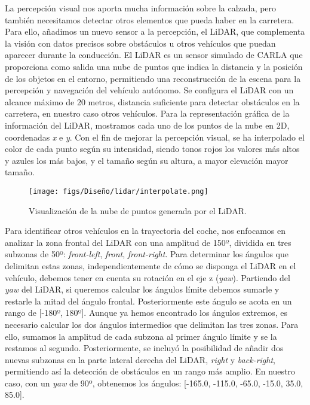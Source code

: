 La percepción visual nos aporta mucha información sobre la calzada, pero también necesitamos detectar otros elementos que pueda haber en la carretera. Para ello, añadimos un nuevo sensor a la percepción, el \ac{LiDAR}, que complementa la visión con datos precisos sobre obstáculos u otros vehículos que puedan aparecer durante la conducción. El \ac{LiDAR} es un sensor simulado de CARLA que proporciona como salida una nube de puntos que indica la distancia y la posición de los objetos en el entorno, permitiendo una reconstrucción de la escena para la percepción y navegación del vehículo autónomo. Se configura el \ac{LiDAR} con un alcance máximo de 20 metros, distancia suficiente para detectar obstáculos en la carretera, en nuestro caso otros vehículos. Para la representación gráfica de la información del \ac{LiDAR}, mostramos cada uno de los puntos de la nube en 2D, coordenadas \textit{x} e \textit{y}. Con el fin de mejorar la percepción visual, se ha interpolado el color de cada punto según su intensidad, siendo tonos rojos los valores más altos y azules los más bajos, y el tamaño según su altura, a mayor elevación mayor tamaño.

\begin{figure}[ht]
\centering
\texttt{[image: figs/Diseño/lidar/interpolate.png]}
\caption{Visualización de la nube de puntos generada por el \ac{LiDAR}.}
\label{fig:interpolate_lidar}
\end{figure}

Para identificar otros vehículos en la trayectoria del coche, nos enfocamos en analizar la zona frontal del \ac{LiDAR} con una amplitud de 150º, dividida en tres subzonas de 50º: \textit{front-left}, \textit{front}, \textit{front-right}. Para determinar los ángulos que delimitan estas zonas, independientemente de cómo se disponga el \ac{LiDAR} en el vehículo, debemos tener en cuenta su rotación en el eje z (\textit{yaw}). Partiendo del \textit{yaw} del \ac{LiDAR}, si queremos calcular los ángulos límite debemos sumarle y restarle la mitad del ángulo frontal. Posteriormente este ángulo se acota en un rango de [-180º, 180º]. Aunque ya hemos encontrado los ángulos extremos, es necesario calcular los dos ángulos intermedios que delimitan las tres zonas. Para ello, sumamos la amplitud de cada subzona al primer ángulo límite y se la restamos al segundo. Posteriormente, se incluyó la posibilidad de añadir dos nuevas subzonas en la parte lateral derecha del \ac{LiDAR}, \textit{right} y \textit{back-right}, permitiendo así la detección de obstáculos en un rango más amplio. En nuestro caso, con un \textit{yaw} de 90º, obtenemos los ángulos: [-165.0, -115.0, -65.0, -15.0, 35.0, 85.0].

